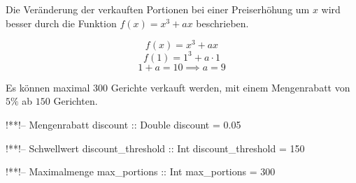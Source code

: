 \begin{frame}\onslide<+->%
    \begin{exercise}[a)]
        Die Veränderung der verkauften Portionen bei einer Preiserhöhung um $x$ wird besser durch die Funktion $f(x) = x^3 + ax$ beschrieben.
    \end{exercise}
    \begin{solve}[a) Berechnen Sie $a$, so dass $f(1)=10$.]\vspace{-\abovedisplayskip}\onslide<+->
        $$f(x)=x^3+ax$$
        $$f(1)=1^3+a\cdot1$$
        $$1+a=10 \implies a=9$$
    \end{solve}
\end{frame}
\addtocounter{exercise}{-1}\addtocounter{solve}{-1}%
\begin{frame}[fragile]\onslide<+->%
    \begin{exercise}[b)]
        Es können maximal $300$ Gerichte verkauft werden, mit einem Mengenrabatt von $5\%$ ab $150$ Gerichten.
    \end{exercise}
    \begin{solve}
    \vspace{-\abovedisplayskip}\begin{minipage}[t]{0.5\linewidth}
    \begin{plainhaskell}
!*\onslide<+->*!-- Mengenrabatt
discount :: Double
discount = 0.05

!*\onslide<+->*!-- Schwellwert
discount_threshold :: Int
discount_threshold = 150
    \end{plainhaskell}
    \end{minipage}\begin{minipage}[t]{0.5\linewidth}
    \begin{plainhaskell}
!*\onslide<+->*!-- Maximalmenge
max_portions :: Int
max_portions = 300
    \end{plainhaskell}
    \end{minipage}
    \end{solve}
\end{frame}
\addtocounter{exercise}{-1}\addtocounter{solve}{-1}%
